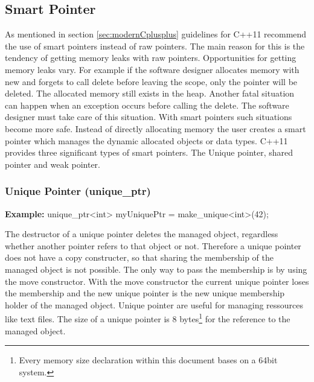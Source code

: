 {
\FloatBarrier

\subsection{Smart Pointer}\label{sec:smartPointer}
\noindent As mentioned in section \ref{sec:modernCplusplus} guidelines for C++11 recommend the use of smart pointers instead of raw pointers. The main reason for this is the tendency of getting memory leaks with raw pointers. Opportunities for getting memory leaks vary. For example if the software designer allocates memory with new and forgets to call delete before leaving the scope, only the pointer will be deleted. The allocated memory still exists in the heap. Another fatal situation can happen when an exception occurs before calling the delete. The software designer must take care of this situation. \cite[cf.][848 - 849]{Kirch2015} With smart pointers such situations become more safe. Instead of directly allocating memory the user creates a smart pointer which manages the dynamic allocated objects or data types. C++11 provides three significant types of smart pointers. The Unique pointer, shared pointer and weak pointer.

\subsubsection{Unique Pointer (unique\_ptr)}\label{sec:uniquePointer}
\begin{center}\textbf{Example:} unique\_ptr<int> myUniquePtr = make\_unique<int>(42);\end{center}
The destructor of a unique pointer deletes the managed object, regardless whether another pointer refers to that object or not. Therefore a unique pointer does not have a copy constructer, so that sharing the membership of the managed object is not possible. The only way to pass the membership is by using the move constructor. With the move constructor the current unique pointer loses the membership and the new unique pointer is the new unique membership holder of the managed object. Unique pointer are useful for managing ressources like text files. \cite[cf.][850 - 853]{Kirch2015} The size of a unique pointer is 8 bytes\footnote{Every memory size declaration within this document bases on a 64bit system.} for the reference to the managed object. 

}
